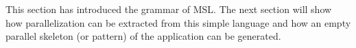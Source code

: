 

This section has introduced the grammar of MSL.
The next section will show how parallelization can be extracted from this simple language and how an empty parallel skeleton (or pattern) of the application can be generated. %
